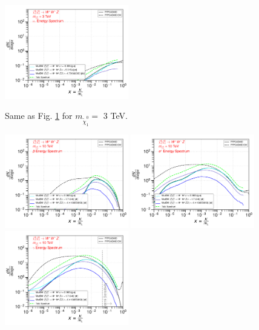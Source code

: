 \documentclass[epj,nopacs,fleqn]{svjour}
\begin{document}
\begin{figure}[!h]
	\subfigure
	{\includegraphics[width=0.48\textwidth]{Fig/Validation_1009/3_neutrinos_tau_n1ww_single_3.pdf} }
	
	\caption{Same as Fig. \ref{singleemission_1tev} for $m_{\tilde \chi_1 ^0}=$ 3 TeV. }
	\label{singleemission_1tev}
\end{figure}


\begin{figure}[!h]
	\centering
	\subfigure
	{ \includegraphics[width=0.48\textwidth]{Fig/Validation_1009/10_antiprotons_n1ww_single_10.pdf} } 
	\subfigure
	{\includegraphics[width=0.48\textwidth]{Fig/Validation_1009/10_positrons_n1ww_single_10.pdf} }
	\subfigure
	{\includegraphics[width=0.48\textwidth]{Fig/Validation_1009/10_gammas_n1ww_single_10.pdf} }

\end{figure}
\end{document}
